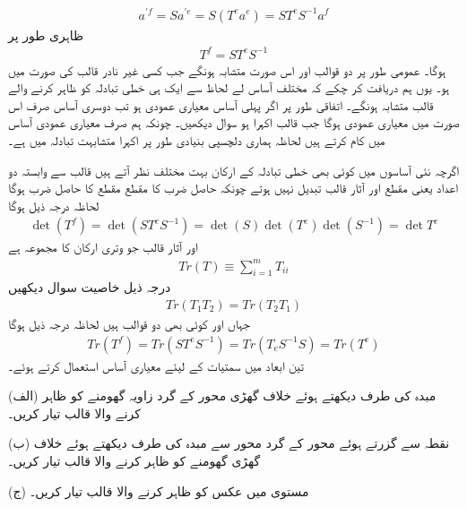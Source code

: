 \begin{align*}
	a^{'f} = Sa^{'e} = S(T^ea^e) = ST^eS^{-1}a^f
\end{align*}
ظاہری طور پر
\begin{align}
	T^f = ST^eS^{-1}
\end{align}
ہوگا۔ عمومی طور پر دو قوالب  اور  اس صورت متشابہ ہونگے جب کسی غیر نادر قالب  کی صورت میں  ہو۔ یوں ہم دریافت کر چکے کہ مختلف آساس لے لحاظ سے ایک ہی خطی تبادلہ کو ظاہر کرنے والے قالب متشابہ ہونگے۔ اتفاقی طور پر اگر پہلی آساس معیاری عمودی ہو تب دوسری آساس صرف اس صورت میں معیاری عمودی ہوگا جب قالب  اکہرا ہو سوال  دیکھیں۔ چونکہ ہم صرف معیاری عمودی آساس میں کام کرتے ہیں لحاظہ ہماری دلچسپی بنیادی طور پر اکہرا متشابہت تبادلہ میں ہے۔

اگرچہ نئی آساسوں میں کوئی بھی خطی تبادلہ کے ارکان بہت مختلف نظر آتے ہیں قالب سے وابستہ دو اعداد یعنی مقطع اور آثار قالب تبدیل نہیں ہوتے چونکہ حاصل ضرب کا مقطع مقطع کا حاصل ضرب ہوگا لحاظہ درجہ ذیل ہوگا 
\begin{align}
	\det(T^f) = \det(ST^eS^{-1}) = \det(S)\det(T^e)\det(S^{-1}) = \det T^e
\end{align}
اور آثار قالب جو وتری ارکان کا مجموعہ ہے 
\begin{align}
	Tr(T)\equiv\sum_{i=1}^{m}T_{ii}
\end{align}
درجہ ذیل خاصیت سوال  دیکھیں
\begin{align}
	Tr(T_1T_2) = Tr(T_2T_1)
\end{align}
جہاں  اور  کوئی بھی دو قوالب ہیں لحاظہ درجہ ذیل ہوگا
\begin{align}
	Tr(T^f) = Tr(ST^eS^{-1}) = Tr(T_eS^{-1}S) = Tr(T^e)
\end{align}
تین ابعاد میں سمتیات کے لیئے معیاری آساس  استعمال کرتے ہوئے۔

(الف) مبدہ کی طرف دیکھتے ہوئے خلاف گھڑی  محور کے گرد زاویہ  گھومنے کو ظاہر کرنے والا قالب تیار کریں۔

(ب) نقطہ  سے گزرتے ہوئے محور کے گرد محور سے مبدہ کی طرف دیکھتے ہوئے خلاف گھڑی  گھومنے کو ظاہر کرنے والا قالب تیار کریں۔

(ج) مستوی  میں عکس کو ظاہر کرنے والا قالب تیار کریں۔

